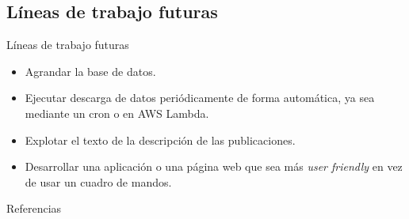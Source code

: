 \documentclass[aspectratio=149]{beamer}
\begin{document}
\subsection{Líneas de trabajo futuras}
\begin{frame}[label=lineas]{Líneas de trabajo futuras}
    \begin{itemize}
        \item Agrandar la base de datos.
        \item Ejecutar descarga de datos periódicamente de forma automática, ya sea mediante un cron o en AWS Lambda.
        \item Explotar el texto de la descripción de las publicaciones.
        \item Desarrollar una aplicación o una página web que sea más \textit{user friendly} en vez de usar un cuadro de mandos.
    \end{itemize}
\end{frame}

\begin{frame}[allowframebreaks]{Referencias}
    \printbibliography
\end{frame}
\end{document}
